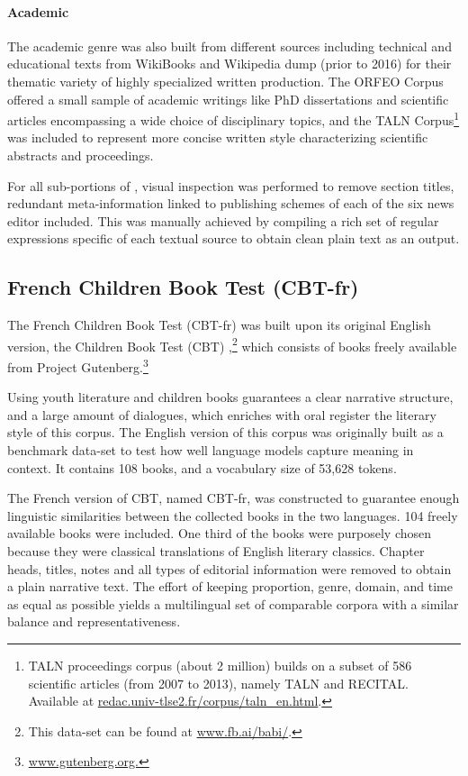 \paragraph{\Cabernet Academic} \label{subsec:DescribeCaBeRnetAcad}
The academic genre was also built from different sources including technical and educational texts from WikiBooks and Wikipedia dump (prior to 2016) for their thematic variety of highly specialized written production. The \textsc{ORFEO} Corpus offered a small sample of academic writings like PhD dissertations and scientific articles encompassing a wide choice of disciplinary topics, and the TALN Corpus\footnote{TALN proceedings corpus (about 2 million) builds on a subset of 586 scientific articles (from 2007 to 2013), namely TALN and RECITAL. Available at \url{redac.univ-tlse2.fr/corpus/taln_en.html}.} was included to represent more concise written style characterizing scientific abstracts and proceedings.

For all sub-portions of \Cabernet, visual inspection was performed to remove section titles, redundant meta-information linked to publishing schemes of each of the six news editor included. This was manually achieved by compiling a rich set of regular expressions specific of each textual source to obtain clean plain text as an output.

\subsection{French Children Book Test (CBT-fr)}
\label{subsec:DescribeCBT}

The French Children Book Test (CBT-fr) was built upon its original English version, the Children Book Test (CBT) \citep{hill-etal-2016-the},\footnote{This data-set can be found at \url{www.fb.ai/babi/}.} which consists of books freely available from Project Gutenberg.\footnote{\url{www.gutenberg.org.}}

Using youth literature and children books guarantees a clear narrative structure, and a large amount of dialogues, which enriches with oral register the literary style of this corpus. The English version of this corpus was originally built as a benchmark data-set to test how well language models capture meaning in context. It contains 108 books, and a vocabulary size of 53,628 tokens.

The French version of CBT, named CBT-fr, was constructed to guarantee enough linguistic similarities between the collected books in the two languages. 104 freely available books were included. One third of the books were purposely chosen because they were classical translations of English literary classics. Chapter heads, titles, notes and all types of editorial information were removed to obtain a plain narrative text. The effort of keeping proportion, genre, domain, and time as equal as possible yields a multilingual set of comparable corpora with a similar balance and representativeness.

